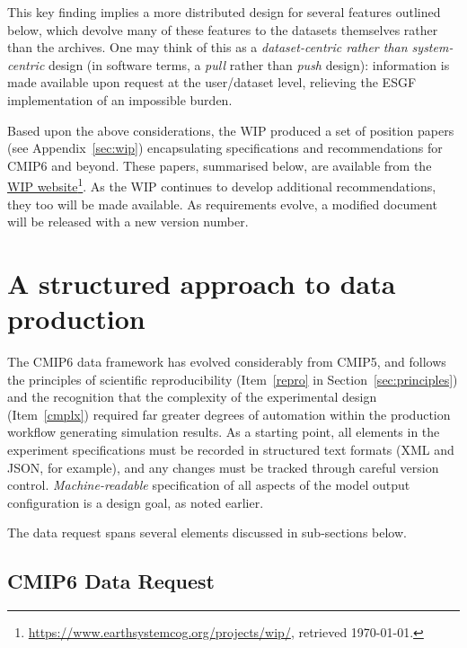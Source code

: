 \documentclass[gmd,manuscript]{copernicus}
\newcommand{\urlref}[2] {\href{#1}{#2}\footnote{\url{#1}, retrieved \today.}}
\begin{document}
\begin{enumerate}
  This key finding implies a more distributed design for several
  features outlined below, which devolve many of these features to the
  datasets themselves rather than the archives. One may think of this
  as a \emph{dataset-centric rather than system-centric} design (in
  software terms, a \emph{pull} rather than \emph{push} design):
  information is made available upon request at the user/dataset
  level, relieving the ESGF implementation of an impossible burden.
\end{enumerate}

Based upon the above considerations, the WIP produced a set of position
papers (see Appendix~\ref{sec:wip}) encapsulating specifications and
recommendations for CMIP6 and beyond. These papers, summarised below,
are available from the
\urlref{https://www.earthsystemcog.org/projects/wip/}{WIP website}. As
the WIP continues to develop additional recommendations, they too will
be made available. As requirements evolve, a modified document will
be released with a new version number.

\section{A structured approach to data production}
\label{sec:dreq}

The CMIP6 data framework has evolved considerably from CMIP5, and
follows the principles of scientific reproducibility (Item~\ref{repro}
in Section~\ref{sec:principles}) and the recognition that the
complexity of the experimental design (Item~\ref{cmplx}) required far
greater degrees of automation within the production workflow generating 
simulation results. As a starting point, 
 all elements in the experiment specifications must be recorded in
structured text formats (XML and JSON, for example), and any changes
must be tracked through careful version control. \emph{Machine-readable} specification of all
 aspects of the model output configuration is a
design goal, as noted earlier.

The data request spans several elements discussed in sub-sections
below.

\subsection{CMIP6 Data Request}
\label{sec:data-request}
\end{document}
